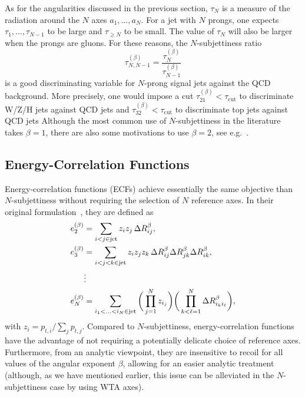 As for the angularities discussed in the previous section, $\tau_N$ is
a measure of the radiation around the $N$ axes $a_1,\dots,a_N$. For a
jet with $N$ prongs, one expects $\tau_1,\dots,\tau_{N-1}$ to be
large and $\tau_{\ge N}$ to be small. The value of $\tau_N$ will also
be larger when the prongs are gluons. For these reasons, the
$N$-subjettiness ratio
\begin{equation}\label{eq:tau_ratios}
  \tau_{N,N-1}^{(\beta)} = \frac{\tau_N^{(\beta)}}{\tau_{N-1}^{(\beta)}}
\end{equation}
is a good discriminating variable for $N$-prong signal jets against
the QCD background.
%
More precisely, one would impose a cut
$\tau_{21}^{(\beta)}<\tau_{\text{cut}}$ to discriminate W/Z/H jets
against QCD jets and $\tau_{32}^{(\beta)}<\tau_{\text{cut}}$ to
discriminate top jets against QCD jets
%
Although the most common use of $N$-subjettiness in the literature
takes $\beta=1$, there are also some motivations to use $\beta=2$, see
e.g.~\cite{Larkoski:2013eya,Salam:2016yht}.


\subsection{Energy-Correlation Functions}\label{sec:def-ecfs}

Energy-correlation functions (ECFs) achieve essentially the same objective
than $N$-subjettiness without requiring the selection of $N$
reference axes.
%
In their original formulation~\cite{Larkoski:2013eya}, they are defined as
\begin{align}
e_2^{(\beta)} &= \sum_{i<j\in{\text{jet}}} z_i z_j \,\Delta R_{ij}^\beta,\label{eq:ecf-e2}\\
e_3^{(\beta)} &= \sum_{i<j<k\in{\text{jet}}} z_i z_j z_k \,\Delta
                R_{ij}^\beta \Delta R_{jk}^\beta \Delta R_{ik}^\beta,\label{eq:ecf-e3}\\
 &\vdots\nonumber\\
e_N^{(\beta)} &= \sum_{i_1<...<i_N\in{\text{jet}}} \bigg(\prod_{j=1}^Nz_{i_j}\bigg)
                \bigg(\prod_{k<\ell=1}^N\Delta R_{i_ki_\ell}^\beta\bigg),\label{eq:ecf-eN}
\end{align}
with $z_i=p_{t,i}/\sum_j p_{t,j}$.
%
Compared to $N$-subjettiness, energy-correlation functions have the
advantage of not requiring a potentially delicate choice of reference
axes. Furthermore, from an analytic viewpoint, they are insensitive to
recoil for all values of the angular exponent $\beta$, allowing for an easier analytic
treatment (although, as we have mentioned earlier, this issue can be alleviated in the
$N$-subjettiness case by using WTA axes).

